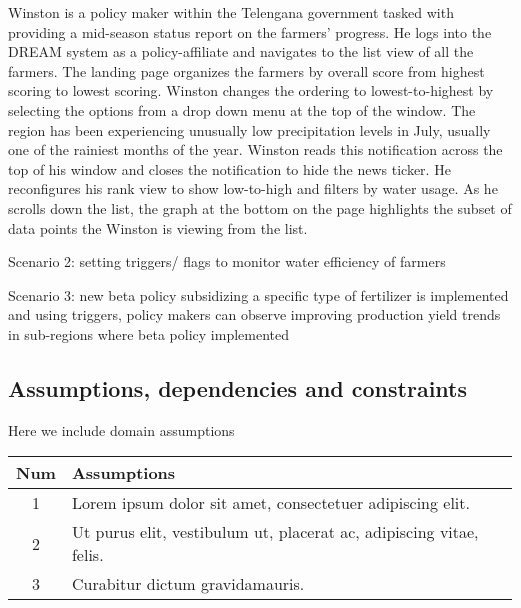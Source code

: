 \begin{flushleft}
\medskip
Winston is a policy maker within the Telengana government tasked with providing a mid-season status report on the farmers’ progress. He logs into the DREAM system as a policy-affiliate and navigates to the list view of all the farmers. The landing page organizes the farmers by overall score from highest scoring to lowest scoring. Winston changes the ordering to lowest-to-highest by selecting the options from a drop down menu at the top of the window. The region has been experiencing unusually low precipitation levels in July, usually one of the rainiest months of the year. Winston reads this notification across the top of his window and closes the notification to hide the news ticker. He reconfigures his rank view to show low-to-high and filters by water usage. As he scrolls down the list, the graph at the bottom on the page highlights the subset of data points the Winston is viewing from the list.

\medskip 
Scenario 2: setting triggers/ flags to monitor water efficiency of farmers

\medskip
Scenario 3: new beta policy subsidizing a specific type of fertilizer is implemented and using triggers, policy makers can observe improving production yield trends in sub-regions where beta policy implemented


\end{flushleft}


\subsection{Assumptions, dependencies and constraints}
Here we include domain assumptions


\begin{center}
\begin{tabular}{|c|>{\raggedright\arraybackslash}m{10cm}|}

    \hline
    \textbf{Num} & \textbf{Assumptions}\\
    \hline
    1 & Lorem ipsum dolor sit amet, consectetuer adipiscing elit.\\
    \hline
    2 & Ut purus elit, vestibulum ut, placerat ac, adipiscing vitae, felis.\\
    \hline
    3 & Curabitur dictum gravidamauris.\\
    \hline
\end{tabular}
\end{center}